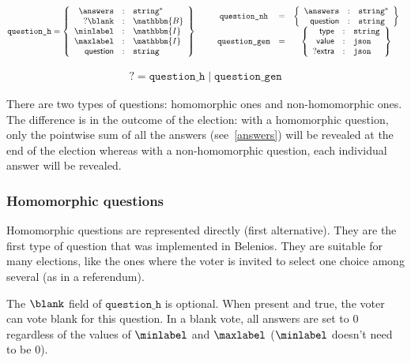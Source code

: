 \documentclass[a4paper]{article}
\newcommand{\I}{\mathbbm{I}}
\newcommand{\B}{\mathbbm{B}}
\newcommand{\jstring}{\texttt{string}}
\begin{document}
\begin{gather*}
  \texttt{question\_h}=\left\{
    \begin{array}{rcl}
      \answers&:&\jstring^\ast\\
      ?\blank&:&\B\\
      \minlabel&:&\I\\
      \maxlabel&:&\I\\
      \textsf{question}&:&\jstring
    \end{array}
  \right\}
  \qquad
  \begin{array}{ccc}
    \texttt{question\_nh}&=&\left\{
      \begin{array}{rcl}
        \answers&:&\jstring^\ast\\
        \textsf{question}&:&\jstring
      \end{array}
    \right\}\\
    \texttt{question\_gen}&=&\left\{
      \begin{array}{rcl}
        \textsf{type}&:&\jstring\\
        \textsf{value}&:&\texttt{json}\\
        ?\textsf{extra}&:&\texttt{json}
      \end{array}
    \right\}
  \end{array}
\end{gather*}

\begin{gather*}
  \question=\texttt{question\_h}\mid\texttt{question\_gen}
\end{gather*}

There are two types of questions: homomorphic ones and non-homomorphic
ones. The difference is in the outcome of the election: with a
homomorphic question, only the pointwise sum of all the answers
(see~\ref{answers}) will be revealed at the end of the election
whereas with a non-homomorphic question, each individual answer will
be revealed.

\subsubsection{Homomorphic questions}

Homomorphic questions are represented directly (first
alternative). They are the first type of question that was implemented
in Belenios. They are suitable for many elections, like the ones where
the voter is invited to select one choice among several (as in a
referendum).

The $\blank$ field of $\texttt{question\_h}$ is optional. When present
and true, the voter can vote blank for this question. In a blank vote,
all answers are set to $0$ regardless of the values of $\minlabel$ and
$\maxlabel$ ($\minlabel$ doesn't need to be $0$).
\end{document}
